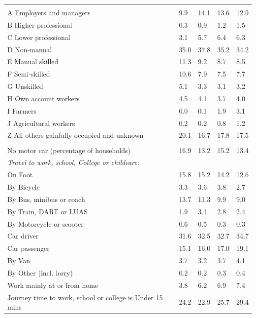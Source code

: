 \documentclass{article}
\begin{document}
\begin{table}[h]
\begin{tabular}{KTTTT}
\hline
    \\ 
    \hline
A Employers and managers &  9.9& 14.1& 13.6& 12.9\\
B Higher professional & 0.3& 0.9& 1.2& 1.5\\
C Lower professional & 3.1& 5.7& 6.4& 6.3\\
D Non-manual & 35.0& 37.8& 35.2& 34.2\\
E Manual skilled & 11.3&  9.2&  8.7&  8.5\\
F Semi-skilled & 10.6&  7.9&  7.5&  7.7\\
G Unskilled & 5.1& 3.3& 3.1& 3.2\\
H Own account workers & 4.5& 4.1& 3.7& 4.0\\
I Farmers & 0.0& 0.1& 1.9& 3.1\\
J Agricultural workers & 0.2& 0.2& 0.8& 1.2\\
Z All others gainfully occupied and unknown & 20.1& 16.7& 17.8& 17.5\\
\hline
{}\hline
    \\ 
    \hline
No motor car (percentage of households) & 16.9& 13.2& 15.2& 
13.4\\
    \hline 
\emph{Travel to work, school, College or childcare:} & & & \\
\quad On Foot & 15.8& 15.2& 14.2& 12.6\\ 
\quad By Bicycle & 3.3& 3.6& 3.8& 2.7\\ 
\quad By Bus, minibus or coach & 13.7& 11.3&  9.9&  9.0\\
\quad By Train, DART or LUAS & 1.9& 3.1& 2.8& 2.4\\
\quad By Motorcycle or scooter & 0.6& 0.5& 0.3& 0.3\\
\quad Car driver & 31.6 & 32.5& 32.7& 34.7\\
\quad Car passenger & 15.1& 16.0& 17.0& 19.1\\
\quad By Van & 3.7& 3.2& 3.7& 4.1\\
\quad By Other (incl. lorry) & 0.2& 0.2& 0.3& 0.4\\
    \hline
Work mainly at or from home & 3.8& 6.2& 6.9& 7.4\\
Journey time to work, school or college is Under 15 mins & 24.2& 22.9& 25.7& 29.4\\

\end{tabular}
\end{table}
\end{document}
